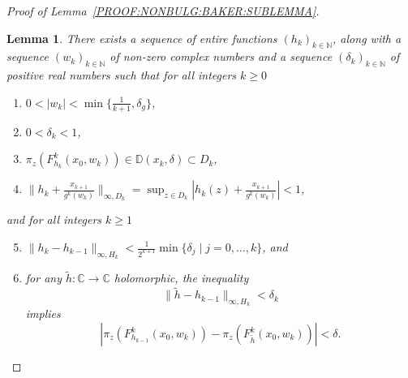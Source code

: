 \documentclass[a4paper, 12pt, twoside]{amsart}
\newtheorem{lem}[thm]{Lemma}
\theoremstyle{definition}
\numberwithin{equation}{section}
\newcommand{\C}{{\mathbb C}}
\newcommand{\D}{{\mathbb D}}
\newcommand{\N}{{\mathbb N}}
\begin{document}
\begin{proof}[Proof of Lemma~\ref{PROOF:NONBULG:BAKER:SUBLEMMA}]
        \begin{lem}\label{PROOF:NONBULG:BAKER:SUBLEMMA2}
            There exists a sequence of entire functions $(h_k)_{k\in\N}$, along with a sequence $(w_k)_{k\in\N}$ of non-zero complex numbers and a sequence $(\delta_k)_{k\in\N}$ of positive real numbers such that for all integers $k \geq 0$
            \begin{enumerate}%
                \item $0 < |{w_k}| < \min\{\frac{1}{k + 1}, \delta_g\}$, \label{PROOF:NONBULG:BAKER:SUBLEMMA:CONSTR1}
                \item $0 < \delta_k < 1$, \label{PROOF:NONBULG:BAKER:SUBLEMMA:CONSTR2}
                \item $\pi_z (F_{h_k}^k(x_0, w_k)) \in \D(x_k, \delta) \subset D_k$, \label{PROOF:NONBULG:BAKER:SUBLEMMA:CONSTR3}
                \item $\|{h_k + \frac{x_{k+1}}{g^k(w_k)}}\|_{\infty, D_{k}} = \sup_{z \in D_k}|{h_k(z) + \frac{x_{k+1}}{g^k(w_k)}}| < 1$, \label{PROOF:NONBULG:BAKER:SUBLEMMA:CONSTR4}
            \end{enumerate}
            and for all integers $k \ge1$
            \begin{enumerate}%
                \setcounter{enumi}{4}
                \item $\|{h_{k} - h_{k-1}}\|_{\infty, H_{k}} < \frac{1}{2^{k+1}} \min\{\delta_j\mid j = 0, \dots, k\}$, and \label{PROOF:NONBULG:BAKER:SUBLEMMA:CONSTR5}
                \item for any $\widetilde{h} : \C \to \C$ holomorphic, the inequality
                \begin{equation}
                    \|{\widetilde{h} - h_{k - 1}}\|_{\infty, H_k} < \delta_k
                \end{equation}
                implies
                \begin{equation}
                    |\pi_z (F_{h_{k-1}}^k(x_0, w_k)) - \pi_z( F_{\widetilde{h}}^k(x_0, w_k))| < \delta.
                \end{equation} \label{PROOF:NONBULG:BAKER:SUBLEMMA:CONSTR6} 
            \end{enumerate}
        \end{lem}



\end{proof}
\end{document}

